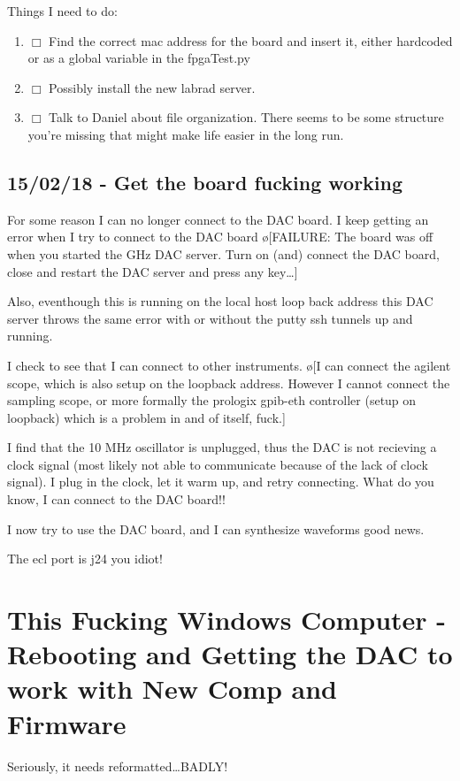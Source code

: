 \documentclass[10pt]{book}
\begin{document}
{Things I need to do:
\begin{enumerate}
    \item $\Box$ Find the correct mac address for the board and insert it, either hardcoded or as a global variable in the fpgaTest.py
    \item $\Box$ Possibly install the new labrad server.
    \item $\Box$ Talk to Daniel about file organization. There seems to be some structure you're missing that might make life easier in the long run.
      
\end{enumerate}

\section{15/02/18 - Get the board fucking working}
For some reason I can no longer connect to the DAC board. I keep getting an error when I try to connect to the DAC board \o[FAILURE: The board was off when you started the GHz DAC server. Turn on (and) connect the DAC board, close and restart the DAC server and press any key\ldots ]{}

Also, eventhough this is running on the local host loop back address this DAC server throws the same error with or without the putty ssh tunnels up and running.

I check to see that I can connect to other instruments. \o[I can connect the agilent scope, which is also setup on the loopback address. However I cannot connect the sampling scope, or more formally the prologix gpib-eth controller (setup on loopback) which is a problem in and of itself, fuck.]{}

I find that the 10 MHz oscillator is unplugged, thus the DAC is not recieving a clock signal (most likely not able to communicate because of the lack of clock signal). I plug in the clock, let it warm up, and retry connecting. What do you know, I can connect to the DAC board!!

I now try to use the DAC board, and I can synthesize waveforms good news.

The ecl port is j24 you idiot!


\chapter{This Fucking Windows Computer - Rebooting and Getting the DAC to work with New Comp and Firmware}
Seriously, it needs reformatted\ldots BADLY! 

}
\end{document}

